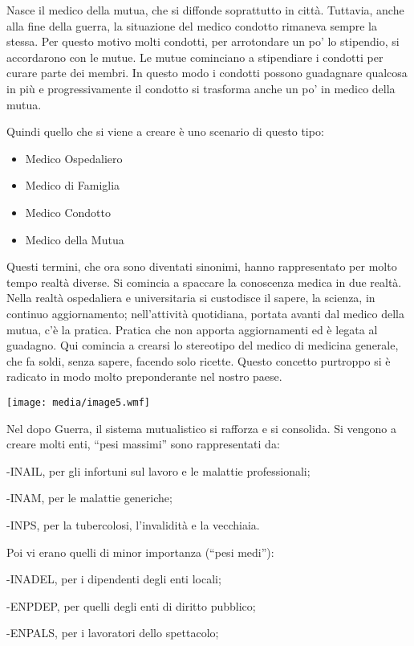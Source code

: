 \documentclass[]{article}
\begin{document}
Nasce il medico della mutua, che si diffonde soprattutto in città.
Tuttavia, anche alla fine della guerra, la situazione del medico
condotto rimaneva sempre la stessa. Per questo motivo molti condotti,
per arrotondare un po' lo stipendio, si accordarono con le mutue. Le
mutue cominciano a stipendiare i condotti per curare parte dei membri.
In questo modo i condotti possono guadagnare qualcosa in più e
progressivamente il condotto si trasforma anche un po' in medico della
mutua.

Quindi quello che si viene a creare è uno scenario di questo tipo:

\begin{itemize}
\item
  Medico Ospedaliero
\item
  Medico di Famiglia
\item
  Medico Condotto
\item
  Medico della Mutua
\end{itemize}

Questi termini, che ora sono diventati sinonimi, hanno rappresentato per
molto tempo realtà diverse. Si comincia a spaccare la conoscenza medica
in due realtà. Nella realtà ospedaliera e universitaria si custodisce il
sapere, la scienza, in continuo aggiornamento; nell'attività quotidiana,
portata avanti dal medico della mutua, c'è la pratica. Pratica che non
apporta aggiornamenti ed è legata al guadagno. Qui comincia a crearsi lo
stereotipo del medico di medicina generale, che fa soldi, senza sapere,
facendo solo ricette. Questo concetto purtroppo si è radicato in modo
molto preponderante nel nostro paese.

\texttt{[image: media/image5.wmf]}

Nel dopo Guerra, il sistema mutualistico si rafforza e si consolida. Si
vengono a creare molti enti, ``pesi massimi'' sono rappresentati da:

-INAIL, per gli infortuni sul lavoro e le malattie professionali;

-INAM, per le malattie generiche;

-INPS, per la tubercolosi, l'invalidità e la vecchiaia.

Poi vi erano quelli di minor importanza (``pesi medi''):

-INADEL, per i dipendenti degli enti locali;

-ENPDEP, per quelli degli enti di diritto pubblico;

-ENPALS, per i lavoratori dello spettacolo;
\end{document}
